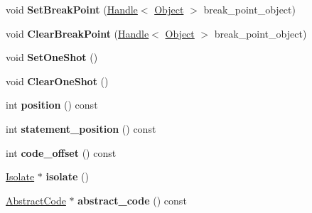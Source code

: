 \begin{DoxyCompactItemize}
\item 
void {\bfseries Set\+Break\+Point} (\hyperlink{classv8_1_1internal_1_1_handle}{Handle}$<$ \hyperlink{classv8_1_1internal_1_1_object}{Object} $>$ break\+\_\+point\+\_\+object)\hypertarget{classv8_1_1internal_1_1_break_location_a3905712e338f7b4725c96a5e178dfda2}{}\label{classv8_1_1internal_1_1_break_location_a3905712e338f7b4725c96a5e178dfda2}

\item 
void {\bfseries Clear\+Break\+Point} (\hyperlink{classv8_1_1internal_1_1_handle}{Handle}$<$ \hyperlink{classv8_1_1internal_1_1_object}{Object} $>$ break\+\_\+point\+\_\+object)\hypertarget{classv8_1_1internal_1_1_break_location_a7b5cdcf176dc60ed75c0f4d38cd31751}{}\label{classv8_1_1internal_1_1_break_location_a7b5cdcf176dc60ed75c0f4d38cd31751}

\item 
void {\bfseries Set\+One\+Shot} ()\hypertarget{classv8_1_1internal_1_1_break_location_ae7d1acd8ab22bf705eb878033f1c3d50}{}\label{classv8_1_1internal_1_1_break_location_ae7d1acd8ab22bf705eb878033f1c3d50}

\item 
void {\bfseries Clear\+One\+Shot} ()\hypertarget{classv8_1_1internal_1_1_break_location_a205fbe9abffd8525a7d824091d0f78ec}{}\label{classv8_1_1internal_1_1_break_location_a205fbe9abffd8525a7d824091d0f78ec}

\item 
int {\bfseries position} () const \hypertarget{classv8_1_1internal_1_1_break_location_a19e4d37aaf780cd9155b343a7abbe084}{}\label{classv8_1_1internal_1_1_break_location_a19e4d37aaf780cd9155b343a7abbe084}

\item 
int {\bfseries statement\+\_\+position} () const \hypertarget{classv8_1_1internal_1_1_break_location_a71c7a316eb331ecacfcb428f0d40525d}{}\label{classv8_1_1internal_1_1_break_location_a71c7a316eb331ecacfcb428f0d40525d}

\item 
int {\bfseries code\+\_\+offset} () const \hypertarget{classv8_1_1internal_1_1_break_location_a3b561ccba83c5ffd05730cc7ea6b35e5}{}\label{classv8_1_1internal_1_1_break_location_a3b561ccba83c5ffd05730cc7ea6b35e5}

\item 
\hyperlink{classv8_1_1internal_1_1_isolate}{Isolate} $\ast$ {\bfseries isolate} ()\hypertarget{classv8_1_1internal_1_1_break_location_ab0af1eda54fe1ff38a7d35d6f5f6920f}{}\label{classv8_1_1internal_1_1_break_location_ab0af1eda54fe1ff38a7d35d6f5f6920f}

\item 
\hyperlink{classv8_1_1internal_1_1_abstract_code}{Abstract\+Code} $\ast$ {\bfseries abstract\+\_\+code} () const \hypertarget{classv8_1_1internal_1_1_break_location_a2de9c12a5515a2024cb4b340294736aa}{}\label{classv8_1_1internal_1_1_break_location_a2de9c12a5515a2024cb4b340294736aa}

\end{DoxyCompactItemize}
